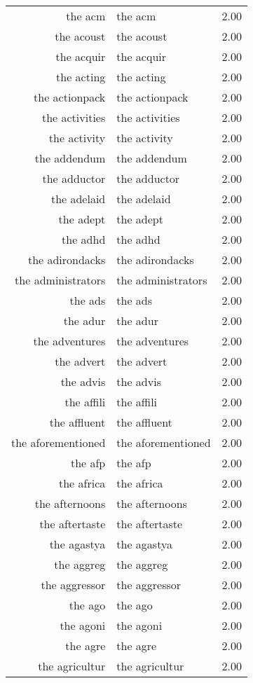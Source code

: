 \begin{table}[ht]
\begin{tabular}{rlr}
  the acm & the acm & 2.00 \\ 
  the acoust & the acoust & 2.00 \\ 
  the acquir & the acquir & 2.00 \\ 
  the acting & the acting & 2.00 \\ 
  the actionpack & the actionpack & 2.00 \\ 
  the activities & the activities & 2.00 \\ 
  the activity & the activity & 2.00 \\ 
  the addendum & the addendum & 2.00 \\ 
  the adductor & the adductor & 2.00 \\ 
  the adelaid & the adelaid & 2.00 \\ 
  the adept & the adept & 2.00 \\ 
  the adhd & the adhd & 2.00 \\ 
  the adirondacks & the adirondacks & 2.00 \\ 
  the administrators & the administrators & 2.00 \\ 
  the ads & the ads & 2.00 \\ 
  the adur & the adur & 2.00 \\ 
  the adventures & the adventures & 2.00 \\ 
  the advert & the advert & 2.00 \\ 
  the advis & the advis & 2.00 \\ 
  the affili & the affili & 2.00 \\ 
  the affluent & the affluent & 2.00 \\ 
  the aforementioned & the aforementioned & 2.00 \\ 
  the afp & the afp & 2.00 \\ 
  the africa & the africa & 2.00 \\ 
  the afternoons & the afternoons & 2.00 \\ 
  the aftertaste & the aftertaste & 2.00 \\ 
  the agastya & the agastya & 2.00 \\ 
  the aggreg & the aggreg & 2.00 \\ 
  the aggressor & the aggressor & 2.00 \\ 
  the ago & the ago & 2.00 \\ 
  the agoni & the agoni & 2.00 \\ 
  the agre & the agre & 2.00 \\ 
  the agricultur & the agricultur & 2.00 \\ 

\end{tabular}
\end{table}
